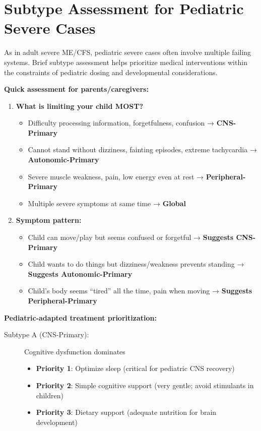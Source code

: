 \section{Subtype Assessment for Pediatric Severe Cases}
\label{sec:ped-severe-subtype}

As in adult severe ME/CFS, pediatric severe cases often involve multiple failing systems. Brief subtype assessment helps prioritize medical interventions within the constraints of pediatric dosing and developmental considerations.

\begin{recommendation}
\label{rec:ped-subtype-severe}

\textbf{Quick assessment for parents/caregivers:}

\begin{enumerate}
    \item \textbf{What is limiting your child MOST?}
    \begin{itemize}
        \item Difficulty processing information, forgetfulness, confusion → \textbf{CNS-Primary}
        \item Cannot stand without dizziness, fainting episodes, extreme tachycardia → \textbf{Autonomic-Primary}
        \item Severe muscle weakness, pain, low energy even at rest → \textbf{Peripheral-Primary}
        \item Multiple severe symptoms at same time → \textbf{Global}
    \end{itemize}

    \item \textbf{Symptom pattern:}
    \begin{itemize}
        \item Child can move/play but seems confused or forgetful → \textbf{Suggests CNS-Primary}
        \item Child wants to do things but dizziness/weakness prevents standing → \textbf{Suggests Autonomic-Primary}
        \item Child's body seems ``tired'' all the time, pain when moving → \textbf{Suggests Peripheral-Primary}
    \end{itemize}
\end{enumerate}

\textbf{Pediatric-adapted treatment prioritization:}

\begin{description}
    \item[Subtype A (CNS-Primary):] Cognitive dysfunction dominates
    \begin{itemize}
        \item \textbf{Priority 1}: Optimize sleep (critical for pediatric CNS recovery)
        \item \textbf{Priority 2}: Simple cognitive support (very gentle; avoid stimulants in children)
        \item \textbf{Priority 3}: Dietary support (adequate nutrition for brain development)
    \end{itemize}


\end{description}
\end{recommendation}
